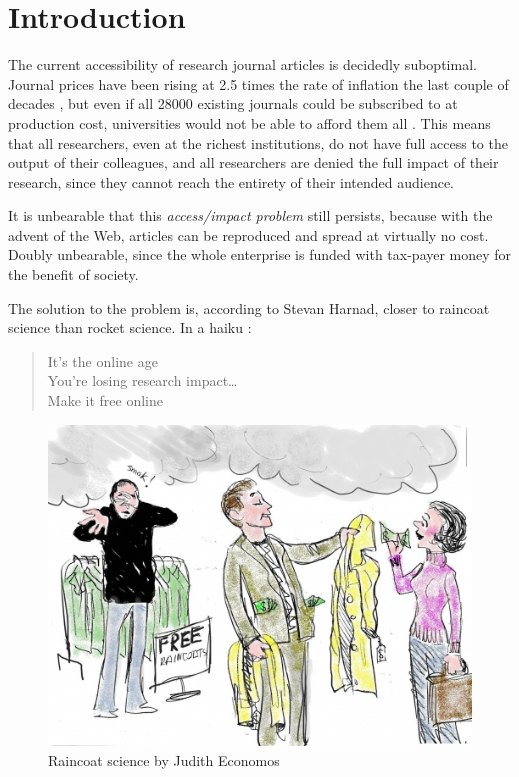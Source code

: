 \documentclass[11pt, openany, oneside, article, a4paper, twocolumn]{memoir}
\begin{document}
\section{Introduction}

The current accessibility of research journal articles is decidedly
suboptimal. Journal prices have been rising at 2.5 times the rate of
inflation the last couple of decades \cite{monograph_serial_costs,
suber2008open}, but even if all 28000 existing journals could be
subscribed to at production cost, universities would not be able to afford
them all \cite{harnad2008access}. This means that all researchers, even at
the richest institutions, do not have full access to the output of their
colleagues, and all researchers are denied the full impact of their
research, since they cannot reach the entirety of their intended audience.

It is unbearable that this \emph{access/impact problem} still persists,
because with the advent of the Web, articles can be reproduced and spread
at virtually no cost. Doubly unbearable, since the whole enterprise is
funded with tax-payer money for the benefit of society. 

The solution to the problem is, according to Stevan Harnad, closer to
raincoat science than rocket science. In a haiku \cite{harnad_raincoat}:

\blockquote{%
It's the online age\\
You're losing research impact\dots \\
Make it free online}

\begin{figure}
  \includegraphics[width=\columnwidth]{rain4.jpg}
  \caption{Raincoat science by Judith Economos}
\end{figure}
\end{document}
